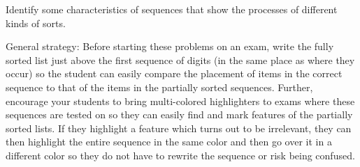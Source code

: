 
\question Identify some characteristics of sequences that show the processes of different kinds of sorts.

\begin{solution}
General strategy: Before starting these problems on an exam, write the fully sorted list just above the first sequence of digits (in the same place as where they occur) so the student can easily compare the placement of items in the correct sequence to that of the items in the partially sorted sequences. Further, encourage your students to bring multi-colored highlighters to exams where these sequences are tested on so they can easily find and mark features of the partially sorted lists. If they highlight a feature which turns out to be irrelevant, they can then highlight the entire sequence in the same color and then go over it in a different color so they do not have to rewrite the sequence or risk being confused. 
\end{solution}

